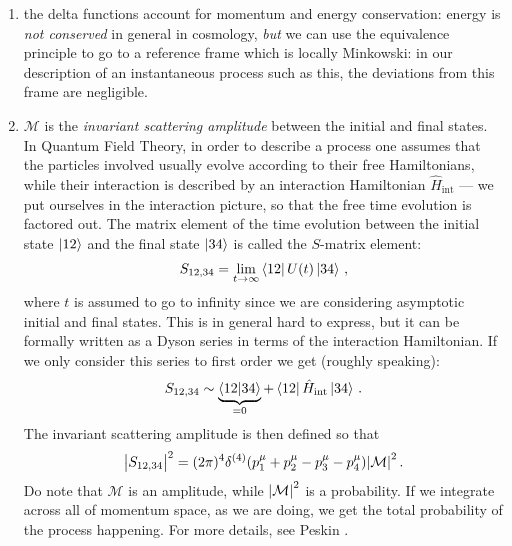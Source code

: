 \documentclass[main.tex]{subfiles}
\begin{document}
\begin{enumerate}
  \item the delta functions account for momentum and energy conservation: energy is \emph{not conserved} in general in cosmology, \emph{but} we can use the equivalence principle to go to a reference frame which is locally Minkowski: in our description of an instantaneous process such as this, the deviations from this frame are negligible.
  \item \(\mathcal{M}\) is the \emph{invariant scattering amplitude} between the initial and final states.
  In Quantum Field Theory, in order to describe a process one assumes that the particles involved usually evolve according to their free Hamiltonians, while their interaction is described by an interaction Hamiltonian \(\hat{H} _{\text{int}}\) --- we put ourselves in the interaction picture, so that the free time evolution is factored out. The matrix element of the time evolution between the initial state \(\ket{12}\) and the final state \(\ket{34}\) is called the \(S\)-matrix element:
  \begin{align}
  S_{12, 34} = \lim_{t \rightarrow \infty } \bra{12} U(t) \ket{34} 
  \,,
  \end{align}
  where \(t\) is assumed to go to infinity since we are considering asymptotic initial and final states. This is in general hard to express, but it can be formally written as a Dyson series in terms of the interaction Hamiltonian. If we only consider this series to first order we get (roughly speaking):
  \begin{align}
  S_{12, 34} \sim \underbrace{\braket{12}{34}}_{=0} + \bra{12} \hat{H}_{\text{int}} \ket{34}
  \,.
  \end{align}
  The invariant scattering amplitude is then defined so that 
  \begin{align}
  \abs{S_{12, 34}}^2 = (2 \pi)^{4} \delta^{(4)} (p^{\mu }_{1} + p^{\mu }_{2} - p^{\mu }_{3} - p^{\mu }_{4}) \abs{\mathcal{M}}^2
  \,.
  \end{align}
  Do note that \(\mathcal{M}\) is an amplitude, while \(\abs{\mathcal{M}}^2\) is a probability. 
  If we integrate across all of momentum space, as we are doing, we get the total probability of the process happening. For more details, see Peskin \cite[sections 7.2, 7.3]{peskinConceptsElementaryParticle2019}.

\end{enumerate}
\end{document}

